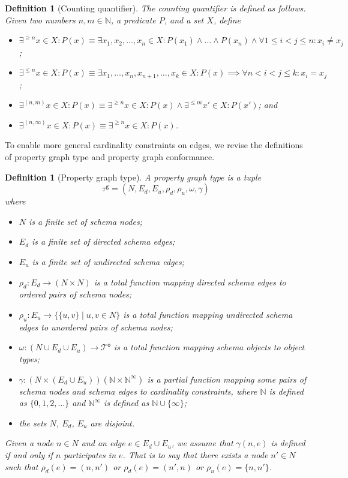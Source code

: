 \documentclass[a4paper]{article}
\makeatletter
\newtheorem{definition}[theorem]{Definition}
\newcommand{\N}{\mathbb{N}}
\newcommand{\pto}{}%
\DeclareRobustCommand{\pto}{\mathrel{\mathpalette\p@to@gets\to}}
\newcommand{\p@to@gets}[2]{%
  \ooalign{\hidewidth$\m@th#1\mapstochar\mkern5mu$\hidewidth\cr$\m@th#1\to$\cr}%
}
\newcommand{\otypes}{\mathcal{T}^\mathsf{o}}
\newcommand{\gtype}{\tau^\mathsf{g}}
\makeatother
\begin{document}
\begin{definition}[Counting quantifier]
  The \emph{counting quantifier} is defined as follows. Given two numbers $n, m \in \N$, a predicate $P$, and a set $X$, define
  \begin{itemize}
    \item $\exists^{\geq n} x \in X : P(x) \equiv \exists x_1, x_2, \ldots, x_n \in X : P(x_1) \wedge \ldots \wedge P(x_n) \wedge \forall 1 \leq i < j \leq n : x_i \neq x_j$;
    \item $\exists^{\leq n} x \in X : P(x) \equiv \exists x_1, \ldots, x_n, x_{n+1}, \ldots, x_k \in X : P(x) \implies \forall n < i < j \leq k : x_i = x_j$;
    \item $\exists^{(n, m)} x \in X : P(x) \equiv \exists^{\geq n} x \in X : P(x) \wedge \exists^{\leq m} x' \in X : P(x')$; and
    \item $\exists^{(n, \infty)} x \in X : P(x) \equiv \exists^{\geq n} x \in X : P(x)$.
  \end{itemize}
\end{definition}

To enable more general cardinality constraints on edges, we revise the definitions of property graph type and property graph conformance.

\begin{definition}[Property graph type]
  A \emph{property graph type} is a tuple \[\gtype = (N, E_d, E_u, \rho_d, \rho_u, \omega, \gamma)\] where
  \begin{itemize}
    \item $N$ is a finite set of schema nodes;
    \item $E_d$ is a finite set of directed schema edges;
    \item $E_u$ is a finite set of undirected schema edges;
    \item $\rho_d : E_d \to (N \times N)$ is a total function mapping directed schema edges to ordered pairs of schema nodes;
    \item $\rho_u : E_u \to \{\{u, v\} \mid u, v \in N\}$ is a total function mapping undirected schema edges to unordered pairs of schema nodes;
    \item $\omega : (N \cup E_d \cup E_u) \to \otypes$ is a total function mapping schema objects to object types;
    \item $\gamma : (N \times (E_d \cup E_u)) \pto (\N \times \N^\infty)$ is a partial function mapping some pairs of schema nodes and schema edges to cardinality constraints, where $\N$ is defined as $\{0, 1, 2, \ldots\}$ and $\N^\infty$ is defined as $\N \cup \{\infty\}$;
    \item the sets $N$, $E_d$, $E_u$ are disjoint.
  \end{itemize}


  Given a node $n \in N$ and an edge $e \in E_d \cup E_u$, we assume that $\gamma(n, e)$ is defined if and only if $n$ \emph{participates} in $e$. That is to say that there exists a node $n' \in N$ such that $\rho_d(e) = (n, n')$ or $\rho_d(e) = (n', n)$ or $\rho_u(e) = \{n, n'\}$.
\end{definition}
\end{document}
